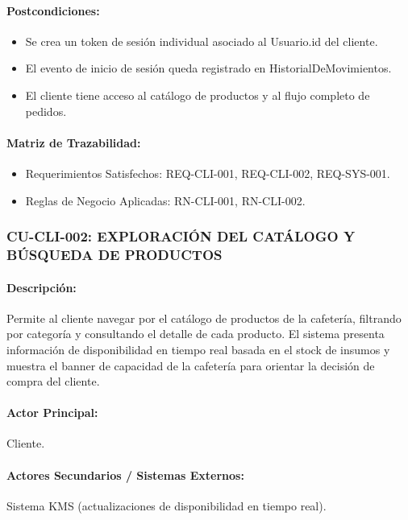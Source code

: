 \paragraph{Postcondiciones:}
\begin{itemize}
    \item Se crea un token de sesión individual asociado al Usuario.id del cliente.
    \item El evento de inicio de sesión queda registrado en HistorialDeMovimientos.
    \item El cliente tiene acceso al catálogo de productos y al flujo completo de pedidos.
\end{itemize}

\paragraph{Matriz de Trazabilidad:}
\begin{itemize}
    \item Requerimientos Satisfechos: REQ-CLI-001, REQ-CLI-002, REQ-SYS-001.
    \item Reglas de Negocio Aplicadas: RN-CLI-001, RN-CLI-002.
\end{itemize}

\subsubsection{CU-CLI-002: EXPLORACIÓN DEL CATÁLOGO Y BÚSQUEDA DE PRODUCTOS}
\paragraph{Descripción:} Permite al cliente navegar por el catálogo de productos de la cafetería, filtrando por categoría y consultando el detalle de cada producto. El sistema presenta información de disponibilidad en tiempo real basada en el stock de insumos y muestra el banner de capacidad de la cafetería para orientar la decisión de compra del cliente.

\paragraph{Actor Principal:} Cliente.

\paragraph{Actores Secundarios / Sistemas Externos:} Sistema KMS (actualizaciones de disponibilidad en tiempo real).

